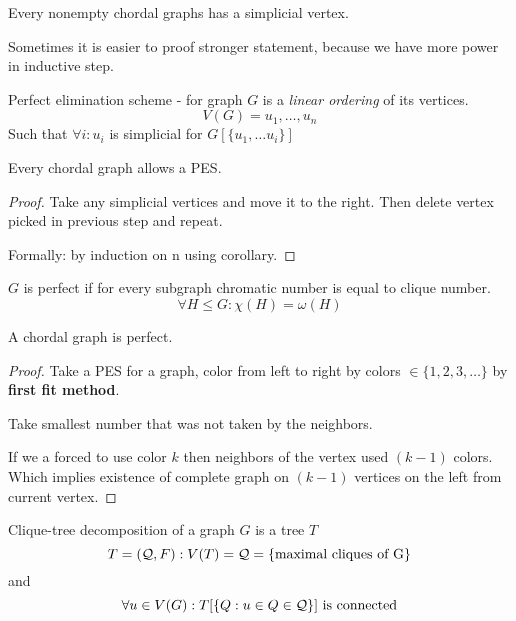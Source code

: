 \begin{corollary}
	Every nonempty chordal graphs has a simplicial vertex.
\end{corollary}

Sometimes it is easier to proof stronger statement, because we have more power in inductive step.

\begin{definition}[PES]
	Perfect elimination scheme - for graph $G$ is a \emph{linear ordering} of its vertices.
	\[ V(G) = u_1, \ldots, u_n\]
	Such that $\forall i: u_i$ is simplicial for $G[\{ u_1, \ldots u_i\}]$
\end{definition}

\begin{lemma}
	Every chordal graph allows a PES.
\end{lemma}
\begin{proof}
	Take any simplicial vertices and move it to the right.
	Then delete vertex picked in previous step and repeat.

	Formally: by induction on n using corollary.
\end{proof}

\begin{definition}
	$G$ is perfect if for every subgraph chromatic number is equal to clique number.
	\[ \forall H \leq G: \chi(H) = \omega(H) \]
\end{definition}

\begin{theorem}
	A chordal graph is perfect.
\end{theorem}
\begin{proof}
	Take a PES for a graph, color from left to right by colors $ \in \{ 1, 2, 3, \ldots \}$ by \textbf{first fit method}.

	Take smallest number that was not taken by the neighbors.

	If we a forced to use color $k$ then neighbors of the vertex used $(k - 1)$ colors.
	Which implies existence of complete graph on $(k - 1)$ vertices on the left from current vertex.
\end{proof}

\begin{definition}
	Clique-tree decomposition of a graph $G$ is a tree $T$
	\[ T = (\operatorname{\mathcal{Q}}, F): V(T) = \operatorname{\mathcal{Q}} = \{\text{maximal cliques of G} \} \]
	and
	\[ \forall u \in V(G): T[ \{Q: u \in Q \in \operatorname{\mathcal{Q}} \}] \text{ is connected} \]
\end{definition}

